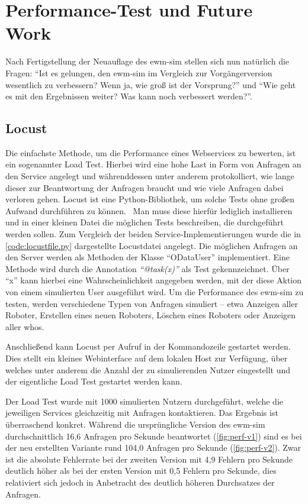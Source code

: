 \chapter{Performance-Test und Future Work}
Nach Fertigstellung der Neuauflage des \ac{ewm-sim} stellen sich nun natürlich die Fragen: \enquote{Ist es gelungen, den \ac{ewm-sim} im Vergleich zur Vorgängerversion wesentlich zu verbessern? Wenn ja, wie groß ist der Vorsprung?} und \enquote{Wie geht es mit den Ergebnissen weiter? Was kann noch verbessert werden?}.

\section{Locust}
Die einfachste Methode, um die Performance eines Webservices zu bewerten, ist ein sogenannter Load Test.
Hierbei wird eine hohe Last in Form von Anfragen an den Service angelegt und währenddessen unter anderem protokolliert, wie lange dieser zur Beantwortung der Anfragen braucht und wie viele Anfragen dabei verloren gehen.
Locust ist eine Python-Bibliothek, um solche Tests ohne großen Aufwand durchführen zu können.~\cite{locust, locust-doc}
Man muss diese hierfür lediglich installieren und in einer kleinen Datei die möglichen Tests beschreiben, die durchgeführt werden sollen.
Zum Vergleich der beiden Service-Implementierungen wurde die in \autoref{code:locustfile.py} dargestellte Locustdatei angelegt.
Die möglichen Anfragen an den Server werden als Methoden der Klasse \enquote{ODataUser} implementiert.
Eine Methode wird durch die Annotation \emph{\enquote{@task(x)}} als Test gekennzeichnet.
Über \enquote{x} kann hierbei eine Wahrscheinlichkeit angegeben werden, mit der diese Aktion von einem simulierten User ausgeführt wird.
Um die Performance des \ac{ewm-sim} zu testen, werden verschiedene Typen von Anfragen simuliert -- etwa Anzeigen aller Roboter, Erstellen eines neuen Roboters, Löschen eines Roboters oder Anzeigen aller \ac{who}s.



Anschließend kann Locust per Aufruf in der Kommandozeile gestartet werden.
Dies stellt ein kleines Webinterface auf dem lokalen Host zur Verfügung, über welches unter anderem die Anzahl der zu simulierenden Nutzer eingestellt und der eigentliche Load Test gestartet werden kann.

Der Load Test wurde mit 1000 simulierten Nutzern durchgeführt, welche die jeweiligen Services gleichzeitig mit Anfragen kontaktieren.
Das Ergebnis ist überraschend konkret.
Während die ursprüngliche Version des \ac{ewm-sim} durchschnittlich 16,6 Anfragen pro Sekunde beantwortet (\autoref{fig:perf-v1}) sind es bei der neu erstellten Variante rund 104,0 Anfragen pro Sekunde (\autoref{fig:perf-v2}).
Zwar ist die absolute Fehlerrate bei der zweiten Version mit 4,9 Fehlern pro Sekunde deutlich höher als bei der ersten Version mit 0,5 Fehlern pro Sekunde, dies relativiert sich jedoch in Anbetracht des deutlich höheren Durchsatzes der Anfragen.

